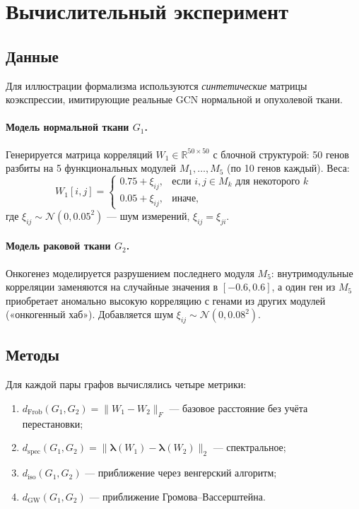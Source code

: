 
\section{Вычислительный эксперимент}
\label{sec:experiment}

\subsection{Данные}

Для иллюстрации формализма используются \emph{синтетические} матрицы коэкспрессии,
имитирующие реальные GCN нормальной и опухолевой ткани.

\paragraph{Модель нормальной ткани $G_1$.}
Генерируется матрица корреляций $W_1 \in \mathbb{R}^{50 \times 50}$
с блочной структурой: 50 генов разбиты на 5 функциональных модулей
$M_1, \ldots, M_5$ (по 10 генов каждый).
Веса:
\[
    W_1[i,j] = \begin{cases}
        0.75 + \xi_{ij}, & \text{если } i, j \in M_k \text{ для некоторого } k \\
        0.05 + \xi_{ij}, & \text{иначе},
    \end{cases}
\]
где $\xi_{ij} \sim \mathcal{N}(0, 0.05^2)$ — шум измерений, $\xi_{ij} = \xi_{ji}$.

\paragraph{Модель раковой ткани $G_2$.}
Онкогенез моделируется разрушением последнего модуля $M_5$:
внутримодульные корреляции заменяются на случайные значения в $[-0.6, 0.6]$,
а один ген из $M_5$ приобретает аномально высокую корреляцию с генами из других модулей
(«онкогенный хаб»). Добавляется шум $\xi_{ij} \sim \mathcal{N}(0, 0.08^2)$.

\subsection{Методы}

Для каждой пары графов вычислялись четыре метрики:
\begin{enumerate}
    \item $d_{\mathrm{Frob}}(G_1, G_2) = \|W_1 - W_2\|_F$ — базовое расстояние без учёта перестановки;
    \item $d_{\mathrm{spec}}(G_1, G_2) = \|\boldsymbol{\lambda}(W_1) - \boldsymbol{\lambda}(W_2)\|_2$ — спектральное;
    \item $d_{\mathrm{iso}}(G_1, G_2)$ — приближение через венгерский алгоритм;
    \item $d_{\mathrm{GW}}(G_1, G_2)$ — приближение Громова–Вассерштейна.
\end{enumerate}

